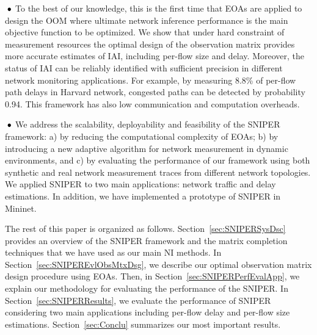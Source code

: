 \textbf{$\text{\hspace{0.1cm}}\bullet$} To the best of our knowledge, this is the first time that EOAs are applied to design the OOM where ultimate network inference performance is the main objective function to be optimized. We show that under hard constraint of measurement resources the optimal design of the observation matrix provides more accurate estimates of IAI, including per-flow size and delay. Moreover, the status of IAI can be reliably identified with sufficient precision in different network monitoring applications. For example, by measuring 8.8\% of per-flow path delays in Harvard network, congested paths can be detected by probability 0.94. This framework has also low communication and computation overheads.

\textbf{$\text{\hspace{0.1cm}}\bullet$} We address the scalability,
deployability and feasibility of the SNIPER framework: a) by reducing
the computational complexity of EOAs; b) by introducing a new adaptive
algorithm for network measurement in dynamic environments, and c) by
evaluating the performance of our framework using both synthetic and
real network measurement traces from different network topologies. We
applied SNIPER to two main applications: network traffic and delay
estimations. In addition, we have implemented a prototype of SNIPER in
Mininet.

The rest of this paper is organized as
follows. Section~\ref{sec:SNIPERSysDsc} provides an overview of the
SNIPER framework and the matrix completion techniques that we have
used as our main NI methods.  In Section~\ref{sec:SNIPEREvlObsMtxDsg},
we describe our optimal observation matrix design procedure using EOAs. Then, in Section~\ref{sec:SNIPERPerfEvalApp}, we explain our
methodology for evaluating the performance of the SNIPER. In
Section~\ref{sec:SNIPERResults}, we evaluate the performance of SNIPER
considering two main applications including per-flow delay and
per-flow size estimations. Section~\ref{sec:Conclu} summarizes our
most important results.